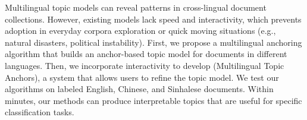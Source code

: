 Multilingual topic models can reveal patterns in cross-lingual document collections.  However, existing models lack speed and interactivity, which prevents adoption in everyday corpora exploration or quick moving situations (e.g., natural disasters, political instability).  First, we propose a multilingual anchoring algorithm that builds an anchor-based topic model for documents in different languages.  Then, we incorporate interactivity to develop \mtanchor (Multilingual Topic Anchors), a system that allows users to refine the topic model.  We test our algorithms on labeled English, Chinese, and Sinhalese documents.  Within minutes, our methods can produce interpretable topics that are useful for specific classification tasks.